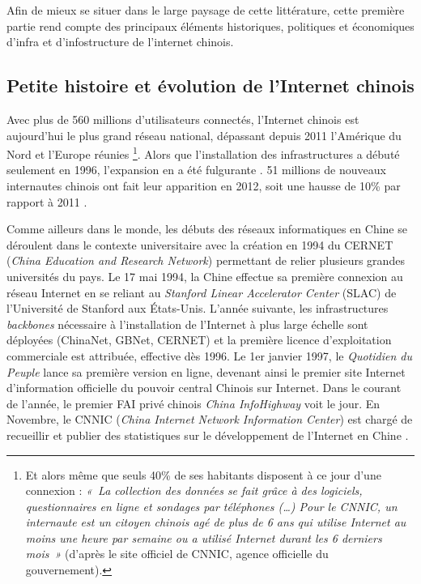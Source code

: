Afin de mieux se situer dans le large paysage de cette littérature, cette première partie rend compte des principaux éléments historiques, politiques et économiques d’infra et d’infostructure de l’internet chinois.

\subsection[Petite histoire et évolution de l’Internet chinois]{Petite histoire et évolution de l’Internet chinois}

Avec plus de 560 millions d’utilisateurs connectés, l’Internet chinois est aujourd’hui le plus grand réseau national, dépassant depuis 2011 l’Amérique du Nord et l’Europe réunies \citep{CNNIC2013}\footnote{Et alors même que seuls 40\% de ses habitants disposent à ce jour d’une connexion : \textit{« La collection des données se fait grâce à des logiciels, questionnaires en ligne et sondages par téléphones (…) Pour le CNNIC, un internaute est un citoyen chinois agé de plus de 6 ans qui utilise Internet au moins une heure par semaine ou a utilisé Internet durant les 6 derniers mois »} (d’après le site officiel de CNNIC, agence officielle du gouvernement).}. Alors que l’installation des infrastructures a débuté seulement en 1996, l’expansion en a été fulgurante \citep{Fang2006}. 51 millions de nouveaux internautes chinois ont fait leur apparition en 2012, soit une hausse de 10\% par rapport à 2011 \citep{CNNIC2013}. 

Comme ailleurs dans le monde, les débuts des réseaux informatiques en Chine se déroulent dans le contexte universitaire avec la création en 1994 du CERNET (\textit{China Education and Research Network}) permettant de relier plusieurs grandes universités du pays. Le 17 mai 1994, la Chine effectue sa première connexion au réseau Internet en se reliant au \textit{Stanford Linear Accelerator Center} (SLAC) de l’Université de Stanford aux États-Unis. L’année suivante, les infrastructures \textit{backbones} nécessaire à l’installation de l’Internet à plus large échelle sont déployées (ChinaNet, GBNet, CERNET) et la première licence d’exploitation commerciale est attribuée, effective dès 1996. Le 1er janvier 1997, le \textit{Quotidien du Peuple} lance sa première version en ligne, devenant ainsi le premier site Internet d’information officielle du pouvoir central Chinois sur Internet. Dans le courant de l’année, le premier FAI privé chinois \textit{China InfoHighway} voit le jour. En Novembre, le CNNIC (\textit{China Internet Network Information Center}) est chargé de recueillir et publier des statistiques sur le développement de l’Internet en Chine \citep{Dai2007}.


